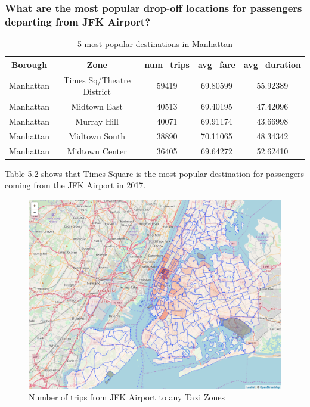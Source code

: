\documentclass[12pt,twoside]{reedthesis}
\theoremstyle{definition}
\theoremstyle{definition}
\theoremstyle{definition}
\theoremstyle{remark}
\begin{document}
\subsubsection{What are the most popular drop-off locations for
passengers departing from JFK
Airport?}\label{what-are-the-most-popular-drop-off-locations-for-passengers-departing-from-jfk-airport}
\begin{table}

\caption{\label{tab:unnamed-chunk-101}5 most popular destinations in Manhattan}
\centering
\begin{tabular}[t]{ccccc}
\toprule
Borough & Zone & num\_trips & avg\_fare & avg\_duration\\
\midrule
Manhattan & Times Sq/Theatre District & 59419 & 69.80599 & 55.92389\\
Manhattan & Midtown East & 40513 & 69.40195 & 47.42096\\
Manhattan & Murray Hill & 40071 & 69.91174 & 43.66998\\
Manhattan & Midtown South & 38890 & 70.11065 & 48.34342\\
Manhattan & Midtown Center & 36405 & 69.64272 & 52.62410\\
\bottomrule
\end{tabular}
\end{table}
Table 5.2 shows that Times Square is the most popular destination for
passengers coming from the JFK Airport in 2017.
\begin{figure}

{\centering \includegraphics[width=5.84in]{figure/from_jfk_num_trips} 

}

\caption{Number of trips from JFK Airport to any Taxi Zones}\label{fig:from-jfk-num-trips}
\end{figure}
\end{document}
